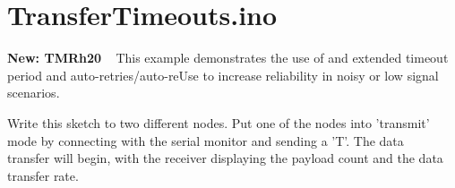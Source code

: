 \hypertarget{_transfer_timeouts_8ino-example}{\section{Transfer\+Timeouts.\+ino}
}
{\bfseries New\+: T\+M\+Rh20 }~\newline
 This example demonstrates the use of and extended timeout period and auto-\/retries/auto-\/re\+Use to increase reliability in noisy or low signal scenarios. ~\newline


Write this sketch to two different nodes. Put one of the nodes into 'transmit' mode by connecting with the serial monitor and sending a 'T'. The data ~\newline
 transfer will begin, with the receiver displaying the payload count and the data transfer rate.


\begin{DoxyCodeInclude}
\end{DoxyCodeInclude}
 